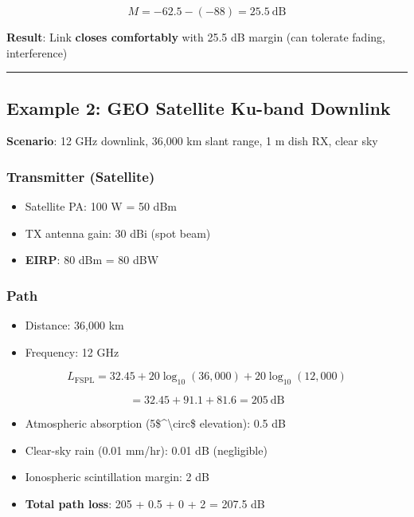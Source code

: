 \[
M = -62.5 - (-88) = 25.5\ \text{dB}
\]

\textbf{Result}: Link \textbf{closes comfortably} with 25.5 dB margin
(can tolerate fading, interference)

\begin{center}\rule{0.5\linewidth}{0.5pt}\end{center}

\subsection{Example 2: GEO Satellite Ku-band
Downlink}\label{example-2-geo-satellite-ku-band-downlink}

\textbf{Scenario}: 12 GHz downlink, 36,000 km slant range, 1 m dish RX,
clear sky

\subsubsection{Transmitter (Satellite)}\label{transmitter-satellite}

\begin{itemize}
\tightlist
\item
  Satellite PA: 100 W = 50 dBm
\item
  TX antenna gain: 30 dBi (spot beam)
\item
  \textbf{EIRP}: 80 dBm = 80 dBW
\end{itemize}

\subsubsection{Path}\label{path-1}

\begin{itemize}
\tightlist
\item
  Distance: 36,000 km
\item
  Frequency: 12 GHz
\end{itemize}

\[
L_{\text{FSPL}} = 32.45 + 20\log_{10}(36,000) + 20\log_{10}(12,000)
\]

\[
= 32.45 + 91.1 + 81.6 = 205\ \text{dB}
\]

\begin{itemize}
\tightlist
\item
  Atmospheric absorption (5\$\^{}\textbackslash circ\$ elevation): 0.5
  dB
\item
  Clear-sky rain (0.01 mm/hr): 0.01 dB (negligible)
\item
  Ionospheric scintillation margin: 2 dB
\item
  \textbf{Total path loss}: 205 + 0.5 + 0 + 2 = 207.5 dB
\end{itemize}

